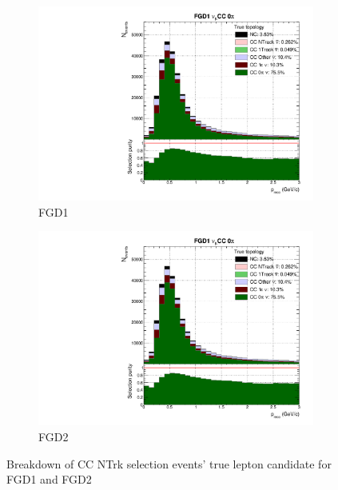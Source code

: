 \begin{figure}[h]
	\begin{subfigure}[t]{0.49\textwidth}
		\includegraphics[width=\textwidth,page=16, trim={0mm 0mm 0mm 9mm}, clip]{figures/mach3/selection/2017b_Diag_WithSelection}
		\caption{FGD1}
	\end{subfigure}
	\begin{subfigure}[t]{0.49\textwidth}
		\includegraphics[width=\textwidth,page=20, trim={0mm 0mm 0mm 9mm}, clip]{figures/mach3/selection/2017b_Diag_WithSelection}
		\caption{FGD2}
	\end{subfigure}
	\caption{Breakdown of \numubar CC NTrk selection events' true lepton candidate for FGD1 and FGD2 }
	\label{fig:ccnubarNtrk_muon}
\end{figure}

